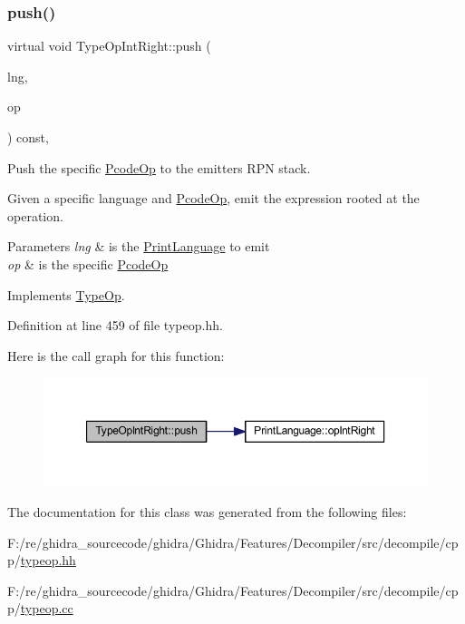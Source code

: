 \subsubsection{\texorpdfstring{push()}{push()}}
{\footnotesize\ttfamily virtual void Type\+Op\+Int\+Right\+::push (\begin{DoxyParamCaption}\item[{\mbox{\hyperlink{class_print_language}{Print\+Language}} $\ast$}]{lng,  }\item[{const \mbox{\hyperlink{class_pcode_op}{Pcode\+Op}} $\ast$}]{op }\end{DoxyParamCaption}) const\hspace{0.3cm}{\ttfamily [inline]}, {\ttfamily [virtual]}}



Push the specific \mbox{\hyperlink{class_pcode_op}{Pcode\+Op}} to the emitter\textquotesingle{}s R\+PN stack. 

Given a specific language and \mbox{\hyperlink{class_pcode_op}{Pcode\+Op}}, emit the expression rooted at the operation. 
\begin{DoxyParams}{Parameters}
{\em lng} & is the \mbox{\hyperlink{class_print_language}{Print\+Language}} to emit \\
\hline
{\em op} & is the specific \mbox{\hyperlink{class_pcode_op}{Pcode\+Op}} \\
\hline
\end{DoxyParams}


Implements \mbox{\hyperlink{class_type_op_ac9c9544203ed74dabe6ac662b653b2af}{Type\+Op}}.



Definition at line 459 of file typeop.\+hh.

Here is the call graph for this function\+:
\nopagebreak
\begin{figure}[H]
\begin{center}
\leavevmode
\includegraphics[width=350pt]{class_type_op_int_right_ad559bbd46ae7088009581400e81fa467_cgraph}
\end{center}
\end{figure}


The documentation for this class was generated from the following files\+:\begin{DoxyCompactItemize}
\item 
F\+:/re/ghidra\+\_\+sourcecode/ghidra/\+Ghidra/\+Features/\+Decompiler/src/decompile/cpp/\mbox{\hyperlink{typeop_8hh}{typeop.\+hh}}\item 
F\+:/re/ghidra\+\_\+sourcecode/ghidra/\+Ghidra/\+Features/\+Decompiler/src/decompile/cpp/\mbox{\hyperlink{typeop_8cc}{typeop.\+cc}}\end{DoxyCompactItemize}
